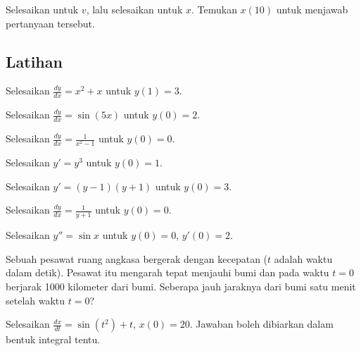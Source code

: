 \begin{exercise}
Selesaikan untuk $v$, lalu selesaikan untuk $x$.  Temukan $x(10)$ untuk menjawab
pertanyaan tersebut.
\end{exercise}

\subsection{Latihan}

\begin{exercise}
Selesaikan $\frac{dy}{dx} = x^2+x$ untuk $y(1)=3$.
\end{exercise}

\begin{exercise}
Selesaikan $\frac{dy}{dx} = \sin (5x)$ untuk $y(0)=2$.
\end{exercise}

\begin{exercise}
Selesaikan $\frac{dy}{dx} = \frac{1}{x^2-1}$ untuk $y(0)=0$.
\end{exercise}

\begin{exercise}
Selesaikan $y' = y^3$ untuk $y(0)=1$.
\end{exercise}

\begin{exercise}
Selesaikan $y' = (y-1)(y+1)$ untuk $y(0)=3$.
\end{exercise}

\begin{exercise}
Selesaikan $\frac{dy}{dx} = \frac{1}{y+1}$ untuk $y(0)=0$.
\end{exercise}

\begin{exercise}
Selesaikan $y'' = \sin x$ untuk $y(0)=0$, $y'(0) = 2$.
\end{exercise}

\begin{exercise}
Sebuah pesawat ruang angkasa bergerak dengan kecepatan  ($t$ adalah
waktu dalam detik).  Pesawat itu mengarah tepat menjauhi bumi dan pada waktu $t=0$
berjarak 1000 kilometer dari bumi.  Seberapa jauh jaraknya dari bumi satu menit setelah
waktu $t=0$?
\end{exercise}

\begin{exercise}
Selesaikan $\frac{dx}{dt} = \sin(t^2)+t$, $x(0)=20$.  Jawaban boleh dibiarkan
dalam bentuk integral tentu.
\end{exercise}

